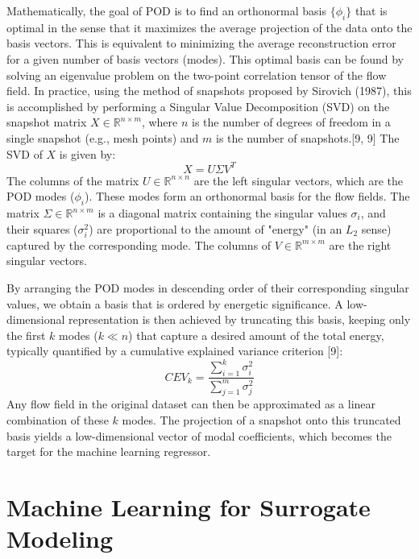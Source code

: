 \documentclass[12pt, a4paper]{report}
\begin{document}
Mathematically, the goal of POD is to find an orthonormal basis $\{\phi_i\}$ that is optimal in the sense that it maximizes the average projection of the data onto the basis vectors. This is equivalent to minimizing the average reconstruction error for a given number of basis vectors (modes). This optimal basis can be found by solving an eigenvalue problem on the two-point correlation tensor of the flow field. In practice, using the method of snapshots proposed by Sirovich (1987), this is accomplished by performing a Singular Value Decomposition (SVD) on the snapshot matrix $X \in \mathbb{R}^{n \times m}$, where $n$ is the number of degrees of freedom in a single snapshot (e.g., mesh points) and $m$ is the number of snapshots.[9, 9] The SVD of $X$ is given by:
$$X = U \Sigma V^T$$
The columns of the matrix $U \in \mathbb{R}^{n \times n}$ are the left singular vectors, which are the POD modes ($\phi_i$). These modes form an orthonormal basis for the flow fields. The matrix $\Sigma \in \mathbb{R}^{n \times m}$ is a diagonal matrix containing the singular values $\sigma_i$, and their squares ($\sigma_i^2$) are proportional to the amount of "energy" (in an $L_2$ sense) captured by the corresponding mode. The columns of $V \in \mathbb{R}^{m \times m}$ are the right singular vectors.

By arranging the POD modes in descending order of their corresponding singular values, we obtain a basis that is ordered by energetic significance. A low-dimensional representation is then achieved by truncating this basis, keeping only the first $k$ modes ($k \ll n$) that capture a desired amount of the total energy, typically quantified by a cumulative explained variance criterion [9]:
$$CEV_k = \frac{\sum_{i=1}^{k} \sigma_i^2}{\sum_{j=1}^{m} \sigma_j^2}$$
Any flow field in the original dataset can then be approximated as a linear combination of these $k$ modes. The projection of a snapshot onto this truncated basis yields a low-dimensional vector of modal coefficients, which becomes the target for the machine learning regressor.

\section{Machine Learning for Surrogate Modeling}
\end{document}
